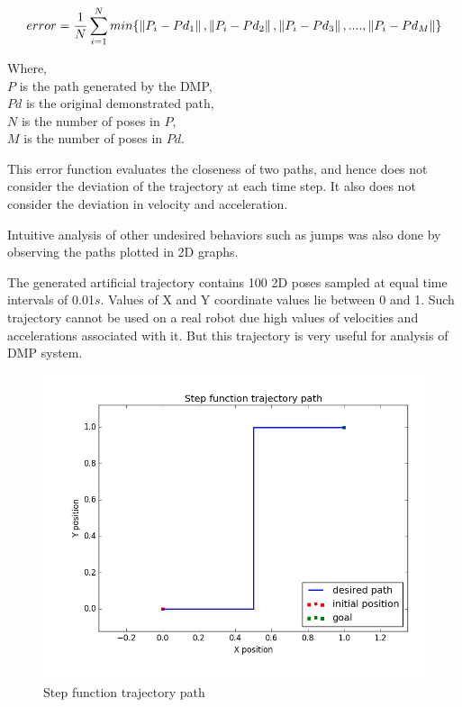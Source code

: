 \begin{equation}\label{t_error}
	error = \frac{1}{N}\sum_{i = 1}^{N}min\{\left\lVert P_{i} - Pd_{1}\right\rVert, \left\lVert P_{i} - Pd_{2}\right\rVert, \left\lVert P_{i} - Pd_{3}\right\rVert, .... , \left\lVert P_{i} - Pd_{M}\right\rVert\}
\end{equation}

Where,\\
$P$ is the path generated by the DMP, \\
$Pd$ is the original demonstrated path, \\
$N$ is the number of poses in $P$, \\
$M$ is the number of poses in $Pd$.


This error function evaluates the closeness of two paths, and hence does not consider the deviation of the trajectory at each time step. It also does not consider the deviation in velocity and acceleration. 

Intuitive analysis of other undesired behaviors such as jumps was also done by observing the paths plotted in 2D graphs.   

The generated artificial trajectory contains 100 2D poses sampled at equal time intervals of 0.01$s$. Values of X and Y coordinate values lie between 0 and 1. Such trajectory cannot be used on a real robot due high values of velocities and accelerations associated with it. But this trajectory is very useful for analysis of DMP system. 

\begin{figure}[H]
	\centering
	\includegraphics[scale=0.5]{images/step_function.png}
	\caption{Step function trajectory path}
	\label{fig:step_function}
\end{figure}

